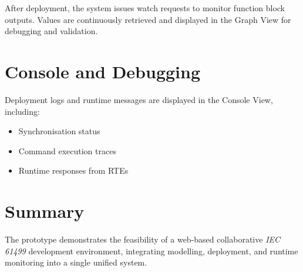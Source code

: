 After deployment, the system issues watch requests to monitor function block outputs. Values are continuously retrieved and displayed in the Graph View for debugging and validation.

\section{Console and Debugging}

Deployment logs and runtime messages are displayed in the Console View, including:
\begin{itemize}
    \item Synchronisation status
    \item Command execution traces
    \item Runtime responses from \acp{RTE}
\end{itemize}

\section{Summary}

The prototype demonstrates the feasibility of a web-based collaborative \textit{IEC 61499} development environment, integrating modelling, deployment, and runtime monitoring into a single unified system.
